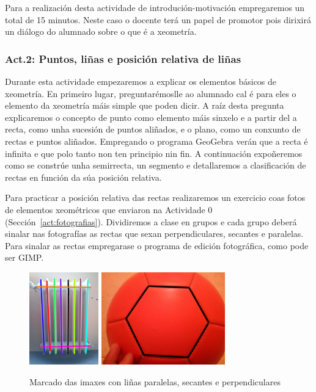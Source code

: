 Para a realización desta actividade de introdución-motivación empregaremos un total de 15 minutos. Neste caso o docente terá un papel de promotor pois dirixirá un diálogo do alumnado sobre o que é a xeometría.

\subsubsection{Act.2: Puntos, liñas e posición relativa de liñas}\label{act:rectas}
Durante esta actividade empezaremos a explicar os elementos básicos de xeometría. En primeiro lugar, preguntarémoslle ao alumnado cal é para eles o elemento da xeometría máis simple que poden dicir. A raíz desta pregunta explicaremos o concepto de punto como elemento máis sinxelo e a partir del a recta, como unha sucesión de puntos aliñados, e o plano, como un conxunto de rectas e puntos aliñados. Empregando o programa GeoGebra verán que a recta é infinita e que polo tanto non ten principio nin fin. A continuación expoñeremos como se constrúe unha semirrecta, un segmento e detallaremos a clasificación de rectas en función da súa posición relativa.

Para practicar a posición relativa das rectas realizaremos un exercicio coas fotos de elementos xeométricos que enviaron na Actividade 0 (Sección~\ref{act:fotografias}). Dividiremos a clase en grupos e cada grupo deberá sinalar nas fotografías as rectas que sexan perpendiculares, secantes e paralelas. Para sinalar as rectas empregarase o programa de edición fotográfica, como pode ser GIMP.

\begin{figure}[h!]
  \centering
  \includegraphics[height=4cm]{img/act1-img.jpg}
  \includegraphics[height=4cm]{img/act1-img2.jpg}
  \caption{Marcado das imaxes con liñas paralelas, secantes e perpendiculares}\label{fig:act2}
\end{figure}

